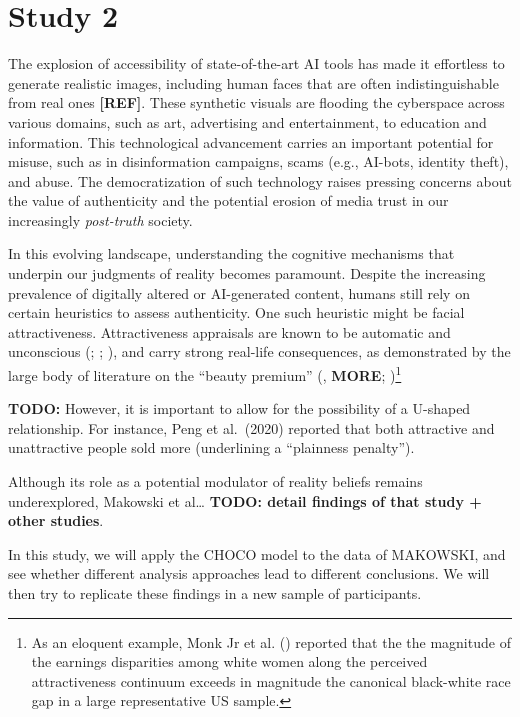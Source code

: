 \documentclass[
  jou,
  floatsintext,
  longtable,
  nolmodern,
  notxfonts,
  notimes,
  colorlinks=true,linkcolor=blue,citecolor=blue,urlcolor=blue]{apa7}
\begin{document}
\section{Study 2}\label{study-2}

The explosion of accessibility of state-of-the-art AI tools has made it
effortless to generate realistic images, including human faces that are
often indistinguishable from real ones \textbf{{[}REF{]}}. These
synthetic visuals are flooding the cyberspace across various domains,
such as art, advertising and entertainment, to education and
information. This technological advancement carries an important
potential for misuse, such as in disinformation campaigns, scams (e.g.,
AI-bots, identity theft), and abuse. The democratization of such
technology raises pressing concerns about the value of authenticity and
the potential erosion of media trust in our increasingly
\emph{post-truth} society.

In this evolving landscape, understanding the cognitive mechanisms that
underpin our judgments of reality becomes paramount. Despite the
increasing prevalence of digitally altered or AI-generated content,
humans still rely on certain heuristics to assess authenticity. One such
heuristic might be facial attractiveness. Attractiveness appraisals are
known to be automatic and unconscious (; ;
), and carry strong
real-life consequences, as demonstrated by the large body of literature
on the ``beauty premium'' (, \textbf{MORE}; )\footnote{As an eloquent example, Monk Jr et al.
  () reported that the the
  magnitude of the earnings disparities among white women along the
  perceived attractiveness continuum exceeds in magnitude the canonical
  black-white race gap in a large representative US sample.}

\textbf{TODO:} However, it is important to allow for the possibility of
a U-shaped relationship. For instance, Peng et al.~(2020) reported that
both attractive and unattractive people sold more (underlining a
``plainness penalty'').

Although its role as a potential modulator of reality beliefs remains
underexplored, Makowski et al\ldots{} \textbf{TODO: detail findings of
that study + other studies}.

In this study, we will apply the CHOCO model to the data of MAKOWSKI,
and see whether different analysis approaches lead to different
conclusions. We will then try to replicate these findings in a new
sample of participants.
\end{document}
